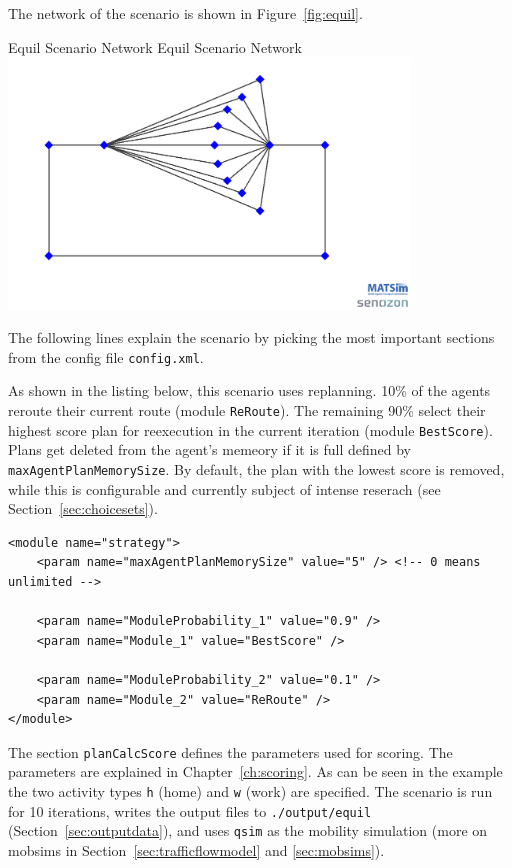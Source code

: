 The network of the scenario is shown in Figure~\ref{fig:equil}.

\createfigure%
{Equil Scenario Network}%
{Equil Scenario Network}%
{\label{fig:equil}}%
{\includegraphics[width=0.8\textwidth, angle=0]{using/figures/equil.png}}%
{}

The following lines explain the scenario by picking the most important sections from the config file \lstinline|config.xml|.

As shown in the listing below, this scenario uses replanning. 10\% of the agents reroute their current route (module \lstinline|ReRoute|). The remaining 90\% select their highest score plan for reexecution in the current iteration (module \lstinline|BestScore|). Plans get deleted from the agent's memeory if it is full defined by \lstinline|maxAgentPlanMemorySize|. By default, the plan with the lowest score is removed, while this is configurable and currently subject of intense reserach (see Section~\ref{sec:choicesets}).
%
\begin{lstlisting}
<module name="strategy">
	<param name="maxAgentPlanMemorySize" value="5" /> <!-- 0 means unlimited -->

	<param name="ModuleProbability_1" value="0.9" />
	<param name="Module_1" value="BestScore" />

	<param name="ModuleProbability_2" value="0.1" />
	<param name="Module_2" value="ReRoute" />
</module>
\end{lstlisting}

The section \lstinline|planCalcScore| defines the parameters used for scoring. The parameters are explained in Chapter~\ref{ch:scoring}. As can be seen in the example the two activity types \lstinline|h| (home) and \lstinline|w| (work) are specified. The scenario is run for 10 iterations, writes the output files to \lstinline|./output/equil| (Section~\ref{sec:outputdata}), and uses \lstinline|qsim| as the mobility simulation (more on \gls{mobsim}s in Section~\ref{sec:trafficflowmodel} and \ref{sec:mobsims}).

